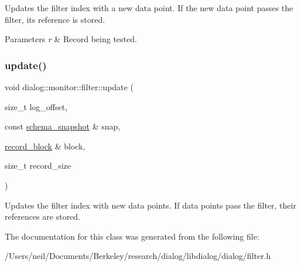 Updates the filter index with a new data point. If the new data point passes the filter, its reference is stored.


\begin{DoxyParams}{Parameters}
{\em r} & Record being tested. \\
\hline
\end{DoxyParams}
\mbox{\label{classdialog_1_1monitor_1_1filter_ad0aba175b70f3bf63c4f0f83b5888ccf}} 
\subsubsection{\texorpdfstring{update()}{update()}\hspace{0.1cm}{\footnotesize\ttfamily [2/2]}}
{\footnotesize\ttfamily void dialog\+::monitor\+::filter\+::update (\begin{DoxyParamCaption}\item[{size\+\_\+t}]{log\+\_\+offset,  }\item[{const \hyperlink{classdialog_1_1schema__snapshot}{schema\+\_\+snapshot} \&}]{snap,  }\item[{\hyperlink{structdialog_1_1record__block}{record\+\_\+block} \&}]{block,  }\item[{size\+\_\+t}]{record\+\_\+size }\end{DoxyParamCaption})\hspace{0.3cm}{\ttfamily [inline]}}

Updates the filter index with new data points. If data points pass the filter, their references are stored. 

The documentation for this class was generated from the following file\+:\begin{DoxyCompactItemize}
\item 
/\+Users/neil/\+Documents/\+Berkeley/research/dialog/libdialog/dialog/filter.\+h\end{DoxyCompactItemize}
